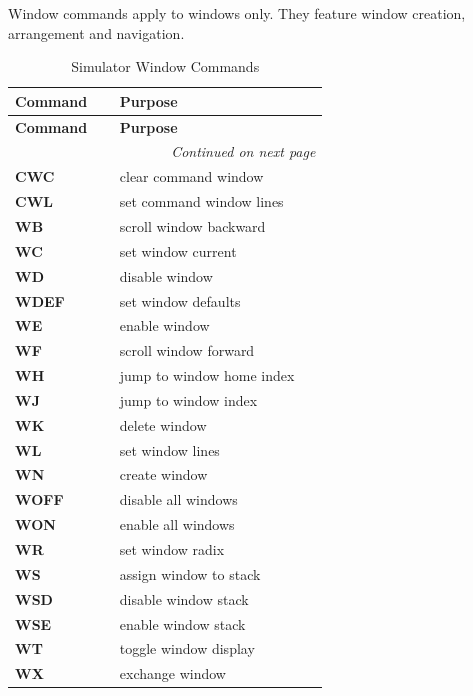 
Window commands apply to windows only. They feature window creation, arrangement and navigation. 


\begin{longtable}{@{}p{0.3\linewidth}p{0.6\linewidth}@{}}
    \caption{Simulator Window Commands} \\
    \toprule
    \textbf{Command} & \textbf{Purpose} \\
    \midrule
    \endfirsthead
    \toprule
     \textbf{Command} & \textbf{Purpose} \\
    \midrule
    \endhead
    \midrule
    \multicolumn{2}{r}{\textit{Continued on next page}} \\
    \midrule
    \endfoot
    \bottomrule
    \endlastfoot
    \textbf{CWC} & clear command window \\
	\midrule
	\textbf{CWL} & set command window lines \\
	\midrule
	\textbf{WB} & scroll window backward \\
	\midrule
	\textbf{WC} & set window current \\
	\midrule
	\textbf{WD} & disable window \\
	\midrule
	\textbf{WDEF} & set window defaults \\
	\midrule
	\textbf{WE} & enable window \\
	\midrule
	\textbf{WF} & scroll window forward \\
	\midrule
	\textbf{WH} & jump to window home index \\
	\midrule
	\textbf{WJ} & jump to window index \\
	\midrule
	\textbf{WK} & delete window \\
    \midrule
	\textbf{WL} & set window lines \\
	\midrule
	\textbf{WN} & create window \\
	\midrule
	\textbf{WOFF} & disable all windows \\
	\midrule
	\textbf{WON} & enable all windows \\
	\midrule
	\textbf{WR} & set window radix \\
	\midrule
	\textbf{WS} & assign window to stack \\
	\midrule
	\textbf{WSD} & disable window stack \\
	\midrule
	\textbf{WSE} & enable window stack \\
	\midrule
	\textbf{WT} & toggle window display \\
	\midrule
	\textbf{WX} & exchange window \\	
	\end{longtable}
	
